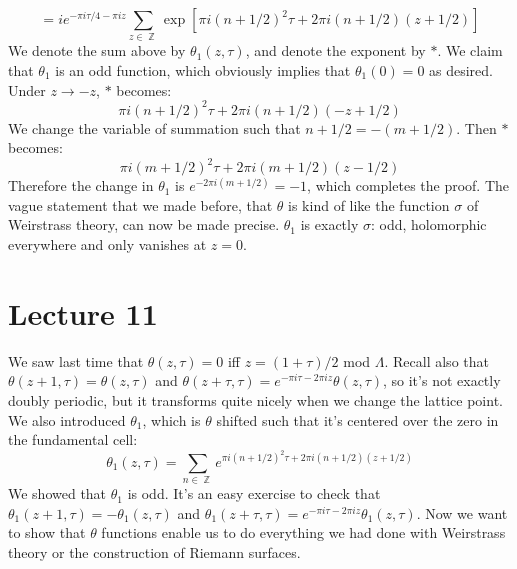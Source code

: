 \documentclass[12 pt]{article}
\DeclareMathOperator {\Z} {\mathbb{Z}}
\theoremstyle{plain}
\theoremstyle{definition}
\theoremstyle{remark}
\begin{document}
\[      =  i e^{- \pi i \tau/4 - \pi i z} \sum_{z \in \Z} \exp \left[  \pi i (n+1/2)^2 \tau + 2\pi i (n+1/2)(z+ 1/2)  \right]   \]
We denote the sum above by $\theta_1(z, \tau)$, and denote the exponent by $*$. We claim that $\theta_1$ is an odd function, which obviously implies that $\theta_1(0) = 0$ as desired. Under $z\to -z$, $*$ becomes:
\[   \pi i (n+1/2)^2 \tau + 2\pi i (n+1/2)(-z+ 1/2)      \]
We change the variable of summation such that $n+ 1/2 = - (m+1/2)$. Then $*$ becomes:
\[      \pi i (m+1/2)^2 \tau + 2\pi i (m+1/2)(z - 1/2)      \]
Therefore the change in $\theta_1$ is $e^{-2\pi i (m+1/2)} = -1$, which completes the proof. The vague statement that we made before, that $\theta$ is kind of like the function $\sigma$ of Weirstrass theory, can now be made precise. $\theta_1$ is exactly $\sigma$: odd, holomorphic everywhere and only vanishes at $z=0$.


\section*{Lecture 11}
We saw last time that $\theta(z, \tau) = 0$ iff $z = (1+\tau)/2$ mod $\Lambda$. Recall also that $\theta(z+1, \tau) = \theta(z,\tau)$ and $\theta(z+\tau, \tau) = e^{-\pi i \tau - 2\pi i z} \theta(z, \tau)$, so it's not exactly doubly periodic, but it transforms quite nicely when we change the lattice point. We also introduced $\theta_1$, which is $\theta$ shifted such that it's centered over the zero in the fundamental cell:
\[       \theta_1 (z, \tau) = \sum_{n\in \Z} e^{\pi i (n+ 1/2)^2 \tau + 2\pi i (n+1/2)(z+1/2)}     \]
We showed that $\theta_1$ is odd. It's an easy exercise to check that $\theta_1 (z+1, \tau) = - \theta_1 (z, \tau)$ and $\theta_1(z+\tau, \tau) = e^{-\pi i \tau - 2\pi i z} \theta_1(z, \tau)$. Now we want to show that $\theta$ functions enable us to do everything we had done with Weirstrass theory or the construction of Riemann surfaces.
\end{document}
